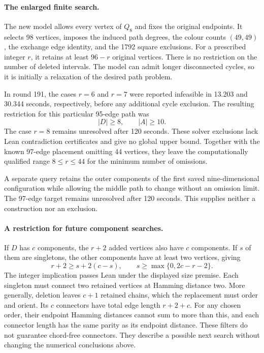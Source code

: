 \documentclass[11pt,a4paper]{article}
\theoremstyle{definition}
\theoremstyle{remark}
\begin{document}
\paragraph{The enlarged finite search.}
The new model allows every vertex of $Q_8$ and fixes the original
endpoints. It selects 98 vertices, imposes the induced path degrees,
the colour counts $(49,49)$, the exchange edge identity, and the 1792
square exclusions. For a prescribed integer $r$, it retains at least
$96-r$ original vertices. There is no restriction on the number of
deleted intervals. The model can admit longer disconnected cycles,
so it is initially a relaxation of the desired path problem.

In round 191, the cases $r=6$ and $r=7$ were reported infeasible in
13.203 and 30.344 seconds, respectively, before any additional cycle
exclusion. The resulting restriction for this particular 95-edge path was
\[
\boxed{|D|\ge8,\qquad |A|\ge10.}
\]
The case $r=8$ remains unresolved after 120 seconds. These solver
exclusions lack Lean contradiction certificates and give no global
upper bound. Together with the known 97-edge placement omitting 44
vertices, they leave the computationally qualified range $8\le r\le44$
for the minimum number of omissions.

A separate query retains the outer components of the first saved
nine-dimensional configuration while allowing the middle path to change
without an omission limit. The 97-edge target remains unresolved after
120 seconds. This supplies neither a construction nor an exclusion.


\paragraph{A restriction for future component searches.}
If $D$ has $c$ components, the $r+2$ added vertices also have $c$
components. If $s$ of them are singletons, the other components have
at least two vertices, giving
\[
r+2\ge s+2(c-s),\qquad s\ge\max\{0,2c-r-2\}.
\]
The integer implication passes Lean under the displayed size premise.
Each singleton must connect two retained vertices at Hamming distance
two. More generally, deletion leaves $c+1$ retained chains, which the
replacement must order and orient. Its $c$ connectors have total edge
length $r+2+c$. For any chosen order, their endpoint Hamming distances
cannot sum to more than this, and each connector length has the same
parity as its endpoint distance. These filters do not guarantee
chord-free connectors. They describe a possible next search without
changing the numerical conclusions above.
\end{document}
